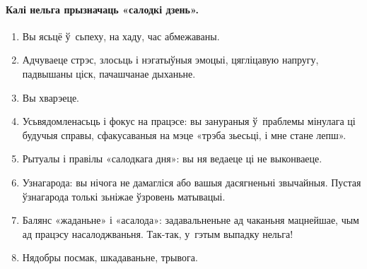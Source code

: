 \paragraph{Калі нельга прызначаць «салодкі дзень».}
\begin{enumerate}[itemindent=3em,labelwidth=1.5em,leftmargin=0pt,nosep]
  \item Вы ясьцё ў~сьпеху, на хаду, час абмежаваны.
  \item Адчуваеце стрэс, злосьць і нэгатыўныя эмоцыі, цягліцавую напругу, падвышаны ціск, пачашчанае дыханьне.
  \item Вы хварэеце.
  \item Усьвядомленасьць і фокус на працэсе: вы занураныя ў~праблемы мінулага ці будучыя справы, сфакусаваныя на мэце «трэба зьесьці, і мне стане лепш».
  \item Рытуалы і правілы «салодкага дня»: вы ня ведаеце ці не выконваеце.
  \item Узнагарода: вы нічога не дамагліся або вашыя дасягненьні звычайныя. Пустая ўзнагарода толькі зьніжае ўзровень матывацыі.
  \item Балянс «жаданьне» і «асалода»: задавальненьне ад чаканьня мацнейшае, чым ад працэсу насалоджваньня. Так-так, у~гэтым выпадку нельга!
  \item Нядобры посмак, шкадаваньне, трывога.
\end{enumerate}